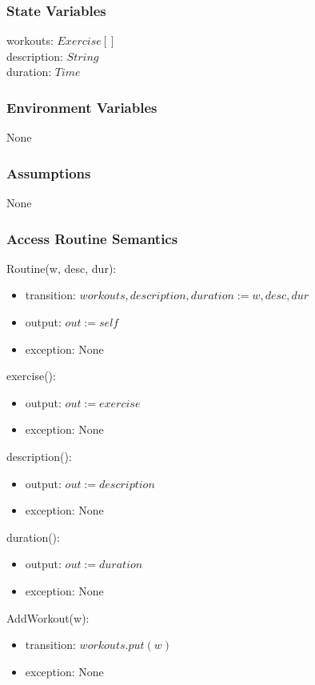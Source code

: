 \documentclass[12pt, titlepage]{article}
\begin{document}
\subsubsection{State Variables}
workouts: $Exercise[]$ \\
description: $String$ \\
duration: $Time$ \\

\subsubsection{Environment Variables}
None
\subsubsection{Assumptions}
None
\subsubsection{Access Routine Semantics}

Routine(w, desc, dur):
\begin{itemize}
	\item transition: $workouts, description, duration := w, desc, dur$
	\item output: $out := self$
	\item exception: None
\end{itemize}

exercise():
\begin{itemize}
	\item output: $out := exercise$
	\item exception: None
\end{itemize}

description():
\begin{itemize}
	\item output: $out := description$
	\item exception: None
\end{itemize}

duration():
\begin{itemize}
	\item output: $out := duration$
	\item exception: None
\end{itemize}

AddWorkout(w):
\begin{itemize}
	\item transition: $workouts.put(w)$
	\item exception: None
\end{itemize}
\end{document}
